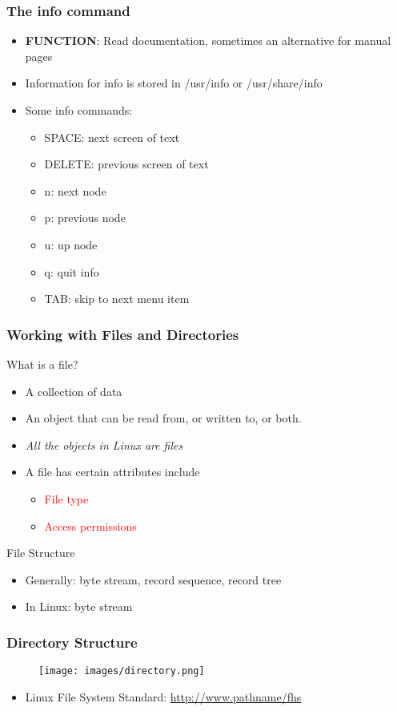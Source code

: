 \documentclass[red]{beamer}
\begin{document}
\begin{CJK*}{GBK}{kai}
\begin{frame}
\frametitle{The info command}
\begin{itemize}
    \item \textbf{FUNCTION}: Read documentation, sometimes an alternative for manual pages
    \item Information for info is stored in /usr/info or /usr/share/info
    \item Some info commands:
    \begin{itemize}
        \item SPACE: next screen of text
        \item DELETE: previous screen of text
        \item n: next node
        \item p: previous node
        \item u: up node
        \item q: quit info
        \item TAB: skip to next menu item
    \end{itemize}
\end{itemize}
\end{frame}

\begin{frame}
\frametitle{Working with Files and Directories}
\begin{block}{What is a file?}
\begin{itemize}
    \item A collection of data
    \item An object that can be read from, or written to, or both.
    \item \emph{All the objects in Linux are files}
    \item A file has certain attributes include
    \begin{itemize}
        \item \textcolor{red}{File type}
        \item \textcolor{red}{Access permissions}
    \end{itemize}
\end{itemize}
\end{block}
\begin{block}{File Structure}
\begin{itemize}
    \item Generally: byte stream, record sequence, record tree
    \item In Linux: byte stream
\end{itemize}
\end{block}
\end{frame}

\begin{frame}
\frametitle{Directory Structure}
\begin{figure}
    \texttt{[image: images/directory.png]}
\end{figure}
\begin{itemize}
    \item Linux File System Standard: \url{http://www.pathname/fhs}
\end{itemize}
\end{frame}

\end{CJK*}
\end{document}
